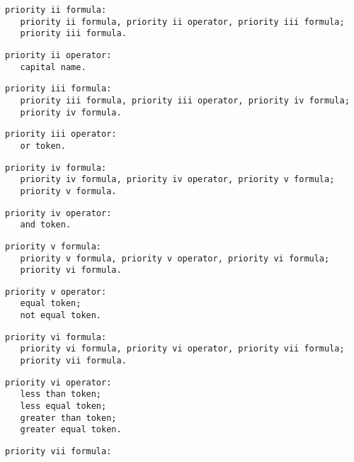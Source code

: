 \documentclass [a4paper,12pt,fleqn]{article}
\begin{document}
\begin{letterlist}
\item
\begin{verbatim}
priority ii formula:
   priority ii formula, priority ii operator, priority iii formula;
   priority iii formula.
\end{verbatim}
\item
\begin{verbatim}
priority ii operator:
   capital name.
\end{verbatim}
\item
\begin{verbatim}
priority iii formula:
   priority iii formula, priority iii operator, priority iv formula;
   priority iv formula.
\end{verbatim}
\item
\begin{verbatim}
priority iii operator:
   or token.
\end{verbatim}
\item
\begin{verbatim}
priority iv formula:
   priority iv formula, priority iv operator, priority v formula;
   priority v formula.
\end{verbatim}
\item
\begin{verbatim}
priority iv operator:
   and token.
\end{verbatim}
\item
\begin{verbatim}
priority v formula:
   priority v formula, priority v operator, priority vi formula;
   priority vi formula.
\end{verbatim}
\item
\begin{verbatim}
priority v operator:
   equal token;
   not equal token.
\end{verbatim}
\item
\begin{verbatim}
priority vi formula:
   priority vi formula, priority vi operator, priority vii formula;
   priority vii formula.
\end{verbatim}
\item
\begin{verbatim}
priority vi operator:
   less than token;
   less equal token;
   greater than token;
   greater equal token.
\end{verbatim}
\item
\begin{verbatim}
priority vii formula:

\end{verbatim}
\end{letterlist}
\end{document}
